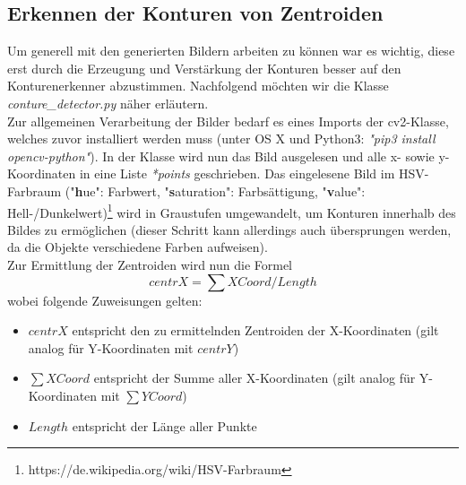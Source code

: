 \subsection{Erkennen der  Konturen von Zentroiden}
\label{section:centroid}
Um generell mit den generierten Bildern arbeiten zu können war es wichtig, diese erst durch die Erzeugung und Verstärkung der Konturen besser auf den Konturenerkenner abzustimmen. Nachfolgend möchten wir die Klasse \textit{conture\_detector.py} näher erläutern. \\
Zur allgemeinen Verarbeitung der Bilder bedarf es eines Imports der cv2-Klasse, welches zuvor installiert werden muss (unter OS X und Python3: \textit{"pip3 install opencv-python"}). In der Klasse wird nun das Bild ausgelesen und alle x- sowie y-Koordinaten in eine Liste \textit{*points} geschrieben. Das eingelesene Bild im HSV-Farbraum ("\textbf{h}ue": Farbwert, "\textbf{s}aturation": Farbsättigung, "\textbf{v}alue": Hell-/Dunkelwert)\footnote{https://de.wikipedia.org/wiki/HSV-Farbraum} wird in Graustufen umgewandelt, um Konturen innerhalb des Bildes zu ermöglichen (dieser Schritt kann allerdings auch übersprungen werden, da die Objekte verschiedene Farben aufweisen). \\ Zur Ermittlung der Zentroiden wird nun die Formel \[centrX = \sum XCoord / Length\] wobei folgende Zuweisungen gelten:
\begin{itemize}
	\item \(centrX\) entspricht den zu ermittelnden Zentroiden der X-Koordinaten (gilt analog für Y-Koordinaten mit \(centrY\))
	\item  \(\sum XCoord\) entspricht der Summe aller X-Koordinaten (gilt analog für Y-Koordinaten mit \(\sum YCoord\))
	\item  \(Length\) entspricht der Länge aller Punkte
\end{itemize}

